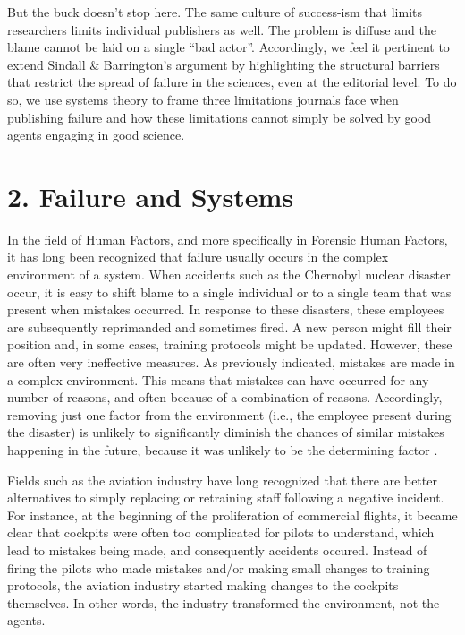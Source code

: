 \documentclass[empirical, author-date]{jote-article}
\begin{document}
But the buck doesn't stop here. The same culture of success-ism that limits researchers limits individual publishers as well. The problem is diffuse and the blame cannot be laid on a single “bad actor”. Accordingly, we feel it pertinent to extend Sindall \& Barrington's argument by highlighting the structural barriers that restrict the spread of failure in the sciences, even at the editorial level. To do so, we use systems theory to frame three limitations journals face when publishing failure and how these limitations cannot simply be solved by good agents engaging in good science. 



\section{2. Failure and Systems }

In the field of Human Factors, and more specifically in Forensic Human Factors, it has long been recognized that failure usually occurs in the complex environment of a system. When accidents such as the Chernobyl nuclear disaster occur, it is easy to shift blame to a single individual or to a single team that was present when mistakes occurred. In response to these disasters, these employees are subsequently reprimanded and sometimes fired. A new person might fill their position and, in some cases, training protocols might be updated. However, these are often very ineffective measures. As previously indicated, mistakes are made in a complex environment. This means that mistakes can have occurred for any number of reasons, and often because of a combination of reasons. Accordingly, removing just one factor from the environment (i.e., the employee present during the disaster) is unlikely to significantly diminish the chances of similar mistakes happening in the future, because it was unlikely to be the determining factor \parencite{Holden2009}. 

Fields such as the aviation industry have long recognized that there are better alternatives to simply replacing or retraining staff following a negative incident. For instance, at the beginning of the proliferation of commercial flights, it became clear that cockpits were often too complicated for pilots to understand, which lead to mistakes being made, and consequently accidents occured. Instead of firing the pilots who made mistakes and/or making small changes to training protocols, the aviation industry started making changes to the cockpits themselves. In other words, the industry transformed the environment, not the agents.
\end{document}
